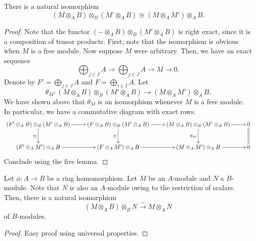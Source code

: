 \begin{theorem}
    There is a natural isomorphism 
    \begin{equation*}
        (M\otimes_A B)\otimes_B(M'\otimes_A B)\cong (M\otimes_A M')\otimes_A B.
    \end{equation*}
\end{theorem}
\begin{proof}
    Note that the functor $(-\otimes_A B)\otimes_B(M'\otimes_A B)$ is right exact, since it is a composition of tensor products. First, note that the isomorphism is obvious when $M$ is a free module. Now suppose $M$ were arbitrary. Then, we have an exact sequence 
    \begin{equation*}
        \bigoplus_{j\in J}A\longrightarrow\bigoplus_{j\in J}A\longrightarrow M\longrightarrow 0.
    \end{equation*}
    Denote by $F' =\bigoplus_{j\in J} A$ and $F = \bigoplus_{i\in I} A$. Let
    \begin{equation*}
        \theta_M: (M\otimes_A B)\otimes_B(M'\otimes_A B)\to (M\otimes_A M')\otimes_A B.
    \end{equation*}
    We have shown above that $\theta_M$ is an isomorphism whenever $M$ is a free module. In particular, we have a commutative diagram with exact rows.
    \begin{equation*}
        \xymatrix {
            (F'\otimes_A B)\otimes_B(M'\otimes_A B)\ar[r]\ar[d]_{\cong} & (F\otimes_A B)\otimes_B(M'\otimes_A B)\ar[r]\ar[d]_{\cong} & (M\otimes_A B)\otimes_B(M'\otimes_A B)\ar[r]\ar[d]_{\theta_M} & 0\ar@{=}[d]\\
            (F'\otimes_A M')\otimes_A B\ar[r] & (F\otimes_A M')\otimes_A B\ar[r] & (M\otimes_A M')\otimes_A B\ar[r] & 0
        }
    \end{equation*}
    Conclude using the five lemma.
\end{proof}

\begin{theorem}
    Let $\phi: A\to B$ be a ring homomorphism. Let $M$ be an $A$-module and $N$ a $B$-module. Note that $N$ is also an $A$-module owing to the restriction of scalars. Then, there is a natural isomorphism 
    \begin{equation*}
        (M\otimes_A B)\otimes_B N\stackrel{\sim}{\longrightarrow} M\otimes_A N
    \end{equation*}
    of $B$-modules.
\end{theorem}
\begin{proof}
    Easy proof using universal properties.
\end{proof}

